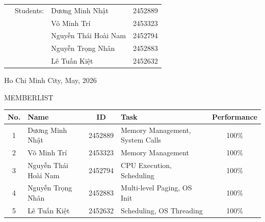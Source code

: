 \begin{titlepage}
\begin{table}[h]
\begin{tabular}{ l l l l }
& Students: 
& Dương Minh Nhật & 2452889 \\   
& & Võ Minh Trí & 2453323 \\   
& & Nguyễn Thái Hoài Nam & 2452794 \\ 
& & Nguyễn Trọng Nhân & 2452883 \\ 
& & Lê Tuấn Kiệt  & 2452632 \\    
\end{tabular}  
\end{table}

\vspace{1.6cm}

\begin{center}
{\footnotesize Ho Chi Minh City, May, 2026}
\end{center}

\end{titlepage}


\begin{center}
\Large MEMBERLIST
\end{center}

\begin{table}[h!]
\centering
\begin{tabularx}{\textwidth}{|c|l|c|X|c|}
\hline
No. & Name & ID & Task & Performance \\
\hline
1 & Dương Minh Nhật & 2452889 & Memory Management, System Calls & 100\% \\  
\hline
2 & Võ Minh Trí & 2453323 & Memory Management & 100\% \\ 
\hline
3 & Nguyễn Thái Hoài Nam & 2452794 & CPU Execution, Scheduling & 100\% \\ 
\hline
4 & Nguyễn Trọng Nhân & 2452883 & Multi-level Paging, OS Init & 100\% \\
\hline
5 & Lê Tuấn Kiệt & 2452632 & Scheduling, OS Threading & 100\% \\
\hline
\end{tabularx}
\end{table}

\newpage
\tableofcontents